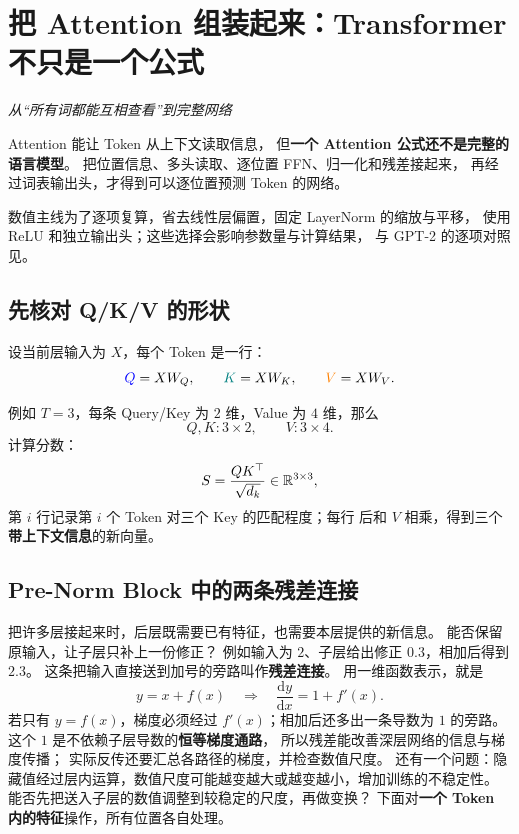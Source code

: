 \chapterrule
\section{把 Attention 组装起来：Transformer 不只是一个公式}
\label{intro:transformer-architecture}

\begin{idea}
\noindent\emph{从“所有词都能互相查看”到完整网络}\par

Attention 能让 Token 从上下文读取信息，
但\textbf{一个 Attention 公式还不是完整的语言模型}。
把位置信息、多头读取、逐位置 FFN、归一化和残差接起来，
再经过词表输出头，才得到可以逐位置预测 Token 的网络。
\end{idea}

数值主线为了逐项复算，省去线性层偏置，固定 LayerNorm 的缩放与平移，
使用 ReLU 和独立输出头；这些选择会影响参数量与计算结果，
与 GPT-2 的逐项对照见。

\subsection{先核对 Q/K/V 的形状}

设当前层输入为 $X$，每个 Token 是一行：
\[
\textcolor{blue}{Q}=XW_Q,\qquad \textcolor{teal}{K}=XW_K,\qquad \textcolor{orange}{V}=XW_V.
\]
\begin{center}\QKVlegend\end{center}
例如 $T=3$，每条 Query/Key 为 $2$ 维，Value 为 $4$ 维，那么
\[
Q,K:3\times2,\qquad V:3\times4.
\]
计算分数：
\[
S=\frac{QK^\top}{\sqrt{d_k}}\in\mathbb{R}^{3\times3},
\]
第 $i$ 行记录第 $i$ 个 Token 对三个 Key 的匹配程度；每行  后和 $V$ 相乘，得到三个\textbf{带上下文信息}的新向量。

\subsection{Pre-Norm Block 中的两条残差连接}

把许多层接起来时，后层既需要已有特征，也需要本层提供的新信息。
能否保留原输入，让子层只补上一份修正？
例如输入为 $2$、子层给出修正 $0.3$，相加后得到 $2.3$。
\label{concept:residual}%
这条把输入直接送到加号的旁路叫作\textbf{残差连接}。
用一维函数表示，就是
\[
y=x+f(x)\quad\Longrightarrow\quad
\frac{\mathrm dy}{\mathrm dx}=1+f'(x).
\]
若只有 $y=f(x)$，梯度必须经过 $f'(x)$；相加后还多出一条导数为 $1$ 的旁路。
这个 $1$ 是不依赖子层导数的\textbf{恒等梯度通路}，
所以残差能改善深层网络的信息与梯度传播；
实际反传还要汇总各路径的梯度，并检查数值尺度。
还有一个问题：隐藏值经过层内运算，数值尺度可能越变越大或越变越小，增加训练的不稳定性。
能否先把送入子层的数值调整到较稳定的尺度，再做变换？
下面对\textbf{一个 Token 内的特征}操作，所有位置各自处理。

